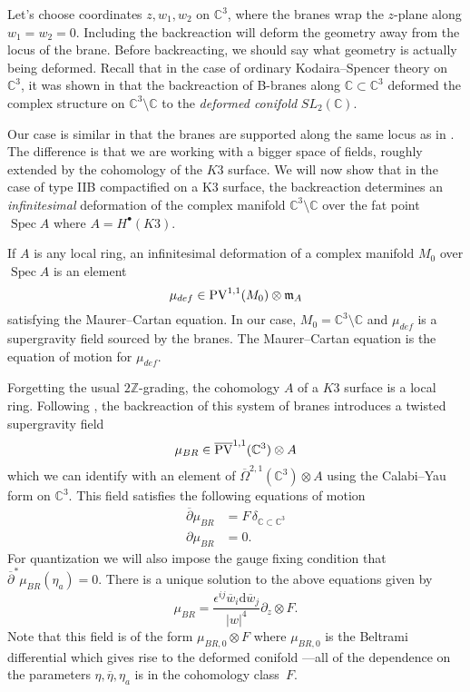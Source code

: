 \documentclass[11pt]{amsart}
\newcommand{\dbar}{\br{\partial}}
\newcommand{\del}{\partial}
\newcommand{\PV}{\op{PV}}
\newcommand{\eps}{\epsilon}
\newcommand{\br}{\overline}
\newcommand{\CC}{\mathbb C}
\renewcommand{\d}{\mathrm{d}}
\def\PV{{\rm PV}}
\newcommand{\op}{\operatorname}
\def\eps{{\epsilon}}
\def\bu{{\bullet}}
\def\ZZ{\mathbb{Z}}
\DeclareMathOperator{\Spec}{Spec}
\def\beqn{\begin{equation}}
\def\eeqn{\end{equation}}
\theoremstyle{thm}
\numberwithin{equation}{subsection}
\theoremstyle{def}
\theoremstyle{rem}
\begin{document}
Let's choose coordinates $z,w_1,w_2$ on $\CC^3$, where the branes wrap the $z$-plane along $w_1=w_2=0$. 
Including the backreaction will deform the geometry away from the locus of the brane. 
Before backreacting, we should say what geometry is actually being deformed. 
Recall that in the case of ordinary Kodaira--Spencer theory on $\CC^3$, it was shown in \cite{CGhol} that the backreaction of B-branes along $\CC \subset\CC^3$ deformed the complex structure on $\CC^3 \setminus \CC$ to the {\em deformed conifold} $SL_2(\CC)$. 

Our case is similar in that the branes are supported along the same locus as in \cite{CGhol}.
The difference is that we are working with a bigger space of fields, roughly extended by the cohomology of the $K3$ surface. 
We will now show that in the case of type IIB compactified on a K3 surface, the backreaction determines an {\em infinitesimal} deformation of the complex manifold $\CC^3 \setminus \CC$ over the fat point $\Spec A$ where $A = H^\bu(K3)$. 
 
If $A$ is any local ring, an infinitesimal deformation of a complex manifold $M_0$ over $\Spec A$ is an element 
\beqn
\mu_{def} \in \PV^{1,1}(M_0) \otimes \mathfrak{m}_A 
\eeqn
satisfying the Maurer--Cartan equation.
In our case, $M_0 = \CC^3 \setminus \CC$ and $\mu_{def}$ is a supergravity field sourced by the branes. 
The Maurer--Cartan equation is the equation of motion for $\mu_{def}$. 

Forgetting the usual $2\ZZ$-grading, the cohomology $A$ of a $K3$ surface is a local ring.
Following \cite{CGhol}, the backreaction of this system of branes introduces a twisted supergravity field
\[
\mu_{BR} \in \br\PV^{1,1}(\CC^3) \otimes A 
\]
which we can identify with an element of $\br\Omega^{2,1}(\CC^3) \otimes A$ using the Calabi--Yau form on $\CC^3$. 
This field satisfies the following equations of motion
\beqn
\label{eqn:mcbr}
	\begin{split}
		\dbar \mu_{BR}  & = F \, \delta_{\CC \subset \CC^3} \\
		\del \mu_{BR} & = 0 .
	\end{split}
\eeqn
For quantization we will also impose the gauge fixing condition that $\dbar^\ast \mu_{BR}(\eta_a) = 0$. 	
There is a unique solution to the above equations given by
\beqn
\mu_{BR} = \frac{\eps^{ij} \br w_i \d \br w_j}{|w|^4} \partial_z \otimes F .
\eeqn
Note that this field is of the form $\mu_{BR,0} \otimes F$ where $\mu_{BR,0}$ is the Beltrami differential which gives rise to the deformed conifold \cite{CGhol}---all of the dependence on the parameters $\eta, \br \eta, \eta_a$ is in the cohomology class~$F$.
\end{document}
